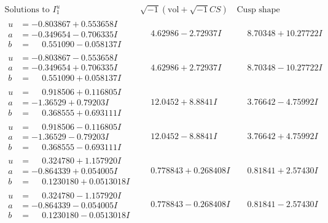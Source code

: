 \documentclass[1p]{elsarticle_modified}
\theoremstyle{definition}
\newcommand{\I}{\sqrt{-1}}
\begin{document}
$$\begin{array}{c|c|c}  
\text{Solutions to }I^u_{1}& \I (\text{vol} + \sqrt{-1}CS) & \text{Cusp shape}\\
 \hline 
\begin{aligned}
u &= -0.803867 + 0.553658 I \\
a &= -0.349654 - 0.706335 I \\
b &= \phantom{-}0.551090 - 0.058137 I\end{aligned}
 & \phantom{-}4.62986 - 2.72937 I & \phantom{-}8.70348 + 10.27722 I \\ \hline\begin{aligned}
u &= -0.803867 - 0.553658 I \\
a &= -0.349654 + 0.706335 I \\
b &= \phantom{-}0.551090 + 0.058137 I\end{aligned}
 & \phantom{-}4.62986 + 2.72937 I & \phantom{-}8.70348 - 10.27722 I \\ \hline\begin{aligned}
u &= \phantom{-}0.918506 + 0.116805 I \\
a &= -1.36529 + 0.79203 I \\
b &= \phantom{-}0.368555 + 0.693111 I\end{aligned}
 & \phantom{-}12.0452 + 8.8841 I & \phantom{-}3.76642 - 4.75992 I \\ \hline\begin{aligned}
u &= \phantom{-}0.918506 - 0.116805 I \\
a &= -1.36529 - 0.79203 I \\
b &= \phantom{-}0.368555 - 0.693111 I\end{aligned}
 & \phantom{-}12.0452 - 8.8841 I & \phantom{-}3.76642 + 4.75992 I \\ \hline\begin{aligned}
u &= \phantom{-}0.324780 + 1.157920 I \\
a &= -0.864339 + 0.054005 I \\
b &= \phantom{-}0.1230180 + 0.0513018 I\end{aligned}
 & \phantom{-}0.778843 + 0.268408 I & \phantom{-}0.81841 + 2.57430 I \\ \hline\begin{aligned}
u &= \phantom{-}0.324780 - 1.157920 I \\
a &= -0.864339 - 0.054005 I \\
b &= \phantom{-}0.1230180 - 0.0513018 I\end{aligned}
 & \phantom{-}0.778843 - 0.268408 I & \phantom{-}0.81841 - 2.57430 I \\ \hline\begin{aligned}

\end{aligned}
\end{array}$$
\end{document}
